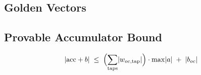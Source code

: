 \subsection{Golden Vectors}
\label{sec:golden}

\subsection{Provable Accumulator Bound}
\label{sec:acc-bound}
%
%
%
\begin{equation}
  \lvert \mathrm{acc} + b \rvert \;\le\;
  \Bigl( \sum_{\mathrm{taps}} \lvert w_{oc,\mathrm{tap}} \rvert \Bigr)
  \cdot \max \lvert a \rvert \;+\; \lvert b_{oc} \rvert
  \label{eq:acc-bound}
\end{equation}
%
%

